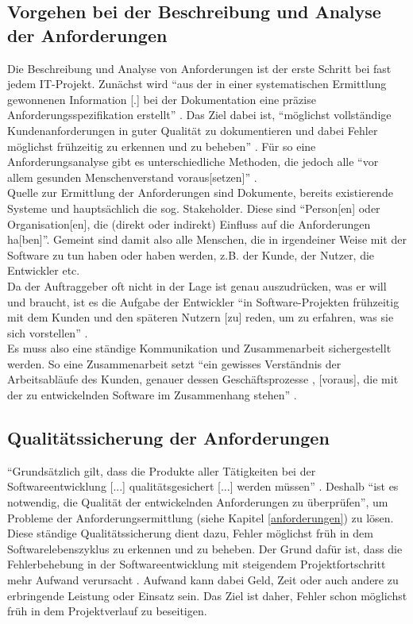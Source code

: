 \documentclass [12pt, a4paper, oneside, titlepage, ngerman]{article}
\begin{document}
\subsection{Vorgehen bei der Beschreibung und Analyse der Anforderungen}
Die Beschreibung und Analyse von Anforderungen ist der erste Schritt bei fast jedem IT-Projekt. Zunächst wird "`aus der in einer systematischen Ermittlung gewonnenen Information [.] bei der Dokumentation eine präzise Anforderungsspezifikation erstellt"' \cite[S.44]{partsch2010}. Das Ziel dabei ist, "`möglichst vollständige Kundenanforderungen in guter Qualität zu dokumentieren und dabei Fehler möglichst frühzeitig zu erkennen und zu beheben"' \cite[S.11]{PohlRupp2015}. Für so eine Anforderungsanalyse gibt es unterschiedliche Methoden, die jedoch alle "`vor allem gesunden Menschenverstand voraus[setzen]"' \cite[S.58]{partsch2010}.\\
Quelle zur Ermittlung der Anforderungen sind Dokumente, bereits existierende Systeme und hauptsächlich die sog. Stakeholder. Diese sind "`Person[en] oder Organisation[en], die (direkt oder indirekt) Einfluss auf die Anforderungen ha[ben]"'\cite[S.21]{PohlRupp2015}. Gemeint sind damit also alle Menschen, die in irgendeiner Weise mit der Software zu tun haben oder haben werden, z.B. der Kunde, der Nutzer, die Entwickler etc. \\
Da der Auftraggeber oft nicht in der Lage ist genau auszudrücken, was er will und braucht, ist es die Aufgabe der Entwickler "`in Software-Projekten frühzeitig mit dem Kunden und den späteren Nutzern [zu] reden, um zu erfahren, was sie sich vorstellen"' \cite[S.15]{kleuker2006}.\\
Es muss also eine ständige Kommunikation und Zusammenarbeit sichergestellt werden. So eine Zusammenarbeit setzt "`ein gewisses Verständnis der Arbeitsabläufe des Kunden, genauer dessen Geschäftsprozesse \cite[vgl.][]{Gad03}, [voraus], die mit der zu entwickelnden Software im Zusammenhang stehen"' \cite[S.15]{kleuker2006}.


\subsection{Qualitätssicherung der Anforderungen}
"`Grundsätzlich gilt, dass die Produkte aller Tätigkeiten bei der Softwareentwicklung [...] qualitätsgesichert [...] werden müssen"' \cite[S.55]{Winter1999}. Deshalb "`ist es notwendig, die Qualität der entwickelnden Anforderungen zu überprüfen"'\cite[S.95]{PohlRupp2015}, um Probleme der Anforderungsermittlung (siehe Kapitel \ref{anforderungen}) zu lösen.  \\
Diese ständige Qualitätssicherung dient dazu, Fehler möglichst früh in dem Softwarelebenszyklus zu erkennen und zu beheben. Der Grund dafür ist, dass die Fehlerbehebung in der Softwareentwicklung mit steigendem Projektfortschritt mehr Aufwand verursacht \cite[vgl.][S.2]{hussmann}. Aufwand kann dabei Geld, Zeit oder auch andere zu erbringende Leistung oder Einsatz sein. Das Ziel ist daher, Fehler schon möglichst früh in dem Projektverlauf zu beseitigen. \\
\end{document}
